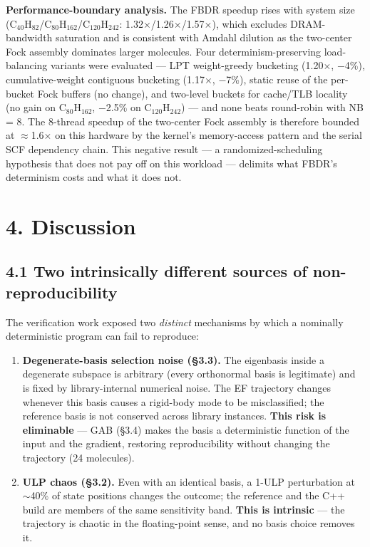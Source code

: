 \documentclass[preprint,12pt]{elsarticle}
\begin{document}
\textbf{Performance-boundary analysis.} The FBDR speedup rises with system size (C$_{40}$H$_{82}$/C$_{80}$H$_{162}$/C$_{120}$H$_{242}$: 1.32$\times$/1.26$\times$/1.57$\times$), which excludes DRAM-bandwidth saturation and is consistent with Amdahl dilution as the two-center Fock assembly dominates larger molecules. Four determinism-preserving load-balancing variants were evaluated --- LPT weight-greedy bucketing (1.20$\times$, $-$4\%), cumulative-weight contiguous bucketing (1.17$\times$, $-$7\%), static reuse of the per-bucket Fock buffers (no change), and two-level buckets for cache/TLB locality (no gain on C$_{80}$H$_{162}$, $-$2.5\% on C$_{120}$H$_{242}$) --- and none beats round-robin with NB = 8. The 8-thread speedup of the two-center Fock assembly is therefore bounded at $\approx$1.6$\times$ on this hardware by the kernel's memory-access pattern and the serial SCF dependency chain. This negative result --- a randomized-scheduling hypothesis that does not pay off on this workload --- delimits what FBDR's determinism costs and what it does not.



\section{4. Discussion}


\subsection{4.1 Two intrinsically different sources of non-reproducibility}
The verification work exposed two \textit{distinct} mechanisms by which a nominally deterministic program can fail to reproduce:

\begin{enumerate}
\item \textbf{Degenerate-basis selection noise (\S{}3.3).} The eigenbasis inside a degenerate subspace is arbitrary (every orthonormal basis is legitimate) and is fixed by library-internal numerical noise. The EF trajectory changes whenever this basis causes a rigid-body mode to be misclassified; the reference basis is not conserved across library instances. \textbf{This risk is eliminable} --- GAB (\S{}3.4) makes the basis a deterministic function of the input and the gradient, restoring reproducibility without changing the trajectory (24 molecules).
\item \textbf{ULP chaos (\S{}3.2).} Even with an identical basis, a 1-ULP perturbation at $\sim$40\% of state positions changes the outcome; the reference and the C++ build are members of the same sensitivity band. \textbf{This is intrinsic} --- the trajectory is chaotic in the floating-point sense, and no basis choice removes it.
\end{enumerate}
\end{document}
